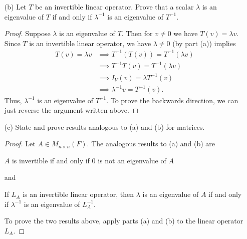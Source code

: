 \begin{enumerate}
\begin{proof}
        For the backwards direction, we proceed via proving the contrapositive. Let \( \lambda = 0  \). Observe that \( \text{det}([T]_{\beta})  \) can be written in the following way:
        \[  \text{det}([T]_{\beta}) = \text{det}([T]_{\beta} - \lambda I).  \]
        Since \( T  \) is not invertible, we have \( \text{det}([T]_{\beta}) = 0  \) implies \( \text{det}([T]_{\beta} - \lambda I ) = 0  \). Thus, \( \lambda = 0  \) is an eigenvalue of \( T  \).
        \end{proof}
    \item[(b)] Let \( T  \) be an invertible linear operator. Prove that a scalar \( \lambda  \) is an eigenvalue of \( T  \) if and only if \( \lambda^{-1}  \) is an eigenvalue of \( T^{-1} \).
        \begin{proof}
        Suppose \( \lambda  \) is an eigenvalue of \( T  \). Then for \( v \neq 0  \) we have \( T(v) = \lambda v  \). Since \( T  \) is an invertible linear operator, we have \( \lambda \neq 0  \) (by part (a)) implies
        \begin{align*}
            T(v) = \lambda v &\implies T^{-1}(T(v)) = T^{-1} (\lambda v)  \\
                             &\implies T^{-1} T (v) = T^{-1}(\lambda v ) \\
                             &\implies {I}_{V}(v) = \lambda T^{-1}(v) \\
                             &\implies \lambda^{-1} v = T^{-1}(v).
        \end{align*}
        Thus, \( \lambda^{-1} \) is an eigenvalue of \( T^{-1} \). To prove the backwards direction, we can just reverse the argument written above.
        \end{proof}
    \item[(c)] State and prove results analogous to (a) and (b) for matrices.
        \begin{proof}
        Let \( A \in {M}_{n \times n}(F) \). The analogous results to (a) and (b) are
        \begin{center}
            \( A  \) is invertible if and only if \( 0  \) is not an eigenvalue of \( A  \)
        \end{center}
        and 
        \begin{center}
           If \( {L}_{A} \) is an invertible linear operator, then \( \lambda  \) is an eigenvalue of \( A   \) if and only if \( \lambda^{-1} \) is an eigenvalue of \( {L}_{A}^{-1} \).
        \end{center}
        To prove the two results above, apply parts (a) and (b) to the linear operator \( {L}_{A} \).
        \end{proof}
\end{enumerate}

